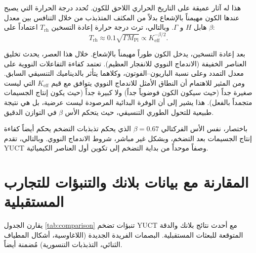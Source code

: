 \documentclass[11pt,a4paper]{article}
\theoremstyle{remark}
\newcommand{\Keff}{K_{\mathrm{eff}}}
\begin{document}
	هذا له آثار عميقة على التاريخ الحراري اللاحق للكون. تُحدد درجة الحرارة التي يصبح عندها الكون مهيمناً بالإشعاع بدلاً من المكثف المتذبذب من خلال التنافس بين معدل هابل $H$ و $\Gamma$. وبالتالي، ترث درجة حرارة إعادة التسخين $T_{\mathrm{rh}}$ اعتماداً على $\beta$:
	\begin{equation}
		T_{\mathrm{rh}} \approx 0.1 \sqrt{\Gamma M_{\mathrm{Pl}}} \propto \Keff^{-\beta/2}.
		\label{eq:trh}
	\end{equation}
	
	بعد إعادة التسخين، يدخل الكون طوراً مهيمناً بالإشعاع. خلال هذا العصر، يحدث تخليق العناصر الخفيفة (الاندماج النووي للانفجار العظيم). تعتمد كفاءة التفاعلات النووية على معدل التمدد وعلى نسبة الباريون–الفوتون، وكلاهما يتأثر بالديناميك التنسيقي السابق. ومن المثير للاهتمام أن النطاق الأمثل للاندماج النووي يتوافق مع قيم $\Keff$ التي ليست صغيرة جداً (حيث سيكون الكون فوضوياً جداً) ولا كبيرة جداً (حيث يكون إنتاج الجسيمات متجمداً بالفعل). هذا يشير إلى أن الوفرة البدائية المرصودة ليست عرضية، بل هي نتيجة طبيعية للتحول الطوري التنسيقي، حيث يتحكم الأس $\beta$ في التوازن الدقيق.
	
	باختصار، نفس الأس الفركتالي $\beta = 0.67$ الذي يحكم تذبذبات التضخم يحكم أيضاً كفاءة إنتاج الجسيمات بعد التضخم، وبشكل غير مباشر، شروط الاندماج النووي. وبالتالي، تقدم YUCT وصفاً موحداً من بداية التضخم إلى تكوين أول العناصر الكيميائية.
	
	\section{المقارنة مع بيانات بلانك والتنبؤات للتجارب المستقبلية}
	\label{sec:comparison}
	
	يقارن الجدول \ref{tab:comparison} تنبؤات تضخم YUCT مع أحدث نتائج بلانك والدقة المتوقعة للبعثات المستقبلية. البصمات الفريدة الجديدة (اللاغاوسية، أشكال المطياف الثنائي، التذبذبات التنسورية) مُضمنة أيضاً.
	
\end{document}
